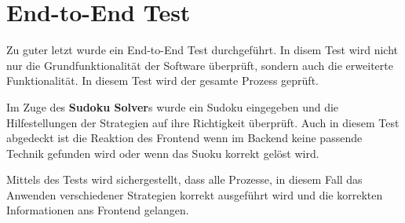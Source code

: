 \section{End-to-End Test}
Zu guter letzt wurde ein End-to-End Test durchgeführt. In disem Test wird nicht nur die Grundfunktionalität der Software überprüft, sondern auch die erweiterte Funktionalität. In diesem Test wird der gesamte Prozess geprüft. 

Im Zuge des \textbf{Sudoku Solver}s wurde ein Sudoku eingegeben und die Hilfestellungen der Strategien auf ihre Richtigkeit überprüft. Auch in diesem Test abgedeckt ist die Reaktion des Frontend wenn im Backend keine passende Technik gefunden wird oder wenn das Suoku korrekt gelöst wird.

Mittels des Tests wird sichergestellt, dass alle Prozesse, in diesem Fall das Anwenden verschiedener Strategien korrekt ausgeführt wird und die korrekten Informationen ans Frontend gelangen.